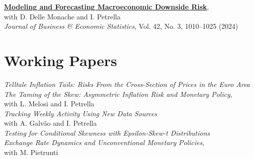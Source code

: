 \documentclass[a4paper,11pt]{article}
\begin{document}
\noindent \href{https://www.tandfonline.com/doi/full/10.1080/07350015.2023.2277171}{\textbf{Modeling and Forecasting Macroeconomic Downside Risk}},\\ with D. Delle Monache and I. Petrella \\
\textit{Journal of Business \& Economic Statistics}, Vol. 42, No. 3, 1010–1025 (2024) \\

\section{Working Papers}
\noindent\textit{Telltale Inflation Tails: Risks From the Cross-Section of Prices in the Euro Area}\\

\noindent \textit{The Taming of the Skew: Asymmetric Inflation Risk and Monetary Policy},\\ with L. Melosi and I. Petrella \\

\noindent\textit{Tracking Weekly Activity Using New Data Sources}\\
with A. Galv\~ao and I. Petrella \\

\noindent \textit{Testing for Conditional Skewness with Epsilon-Skew-t Distributions} \\

\noindent \textit{Exchange Rate Dynamics and Unconventional Monetary Policies},\\
with M. Pietrunti
\end{document}
